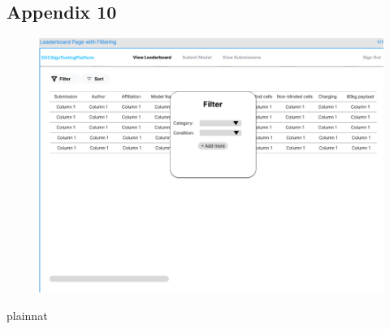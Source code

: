 \documentclass[12pt, titlepage]{article}
\begin{document}
\subsection{Appendix 10} \label{Appendix 10}
\begin{figure}[H]
    \centering
    \includegraphics[width=1\linewidth]{Design/SoftArchitecture/Interface/Filtering.png}
\end{figure}


 {plainnat}


\newpage{}
\end{document}
